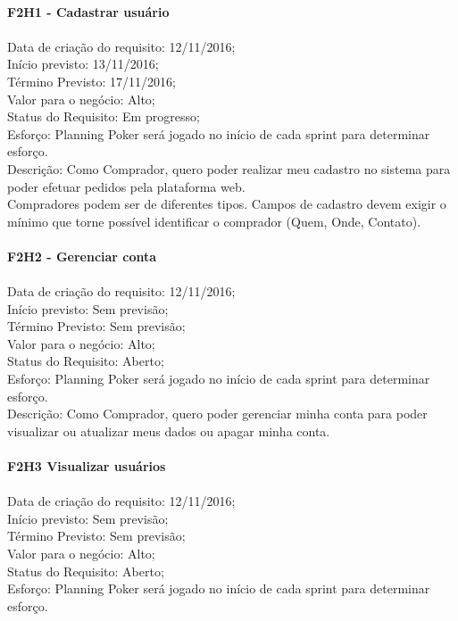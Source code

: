 \begin{apendicesenv}
\\
\textbf{F2H1 - Cadastrar usuário}\\ \\
\tab Data de criação do requisito: 12/11/2016;\\
\tab Início previsto: 13/11/2016;\\
\tab Término Previsto: 17/11/2016;\\
\tab Valor para o negócio: Alto;\\
\tab Status do Requisito: Em progresso;\\
\tab Esforço: Planning Poker será jogado no início de cada sprint para determinar esforço.\\
\tab Descrição: Como Comprador, quero poder realizar meu cadastro no sistema para poder efetuar pedidos pela plataforma web.\\
\tab Compradores podem ser de diferentes tipos. Campos de cadastro devem exigir o mínimo que torne possível identificar o comprador (Quem, Onde, Contato).\\
\\
\textbf{F2H2 - Gerenciar conta}\\ \\
\tab Data de criação do requisito: 12/11/2016;\\
\tab Início previsto: Sem previsão;\\
\tab Término Previsto: Sem previsão;\\
\tab Valor para o negócio: Alto;\\
\tab Status do Requisito: Aberto;\\
\tab Esforço: Planning Poker será jogado no início de cada sprint para determinar esforço.\\
\tab Descrição: Como Comprador, quero poder gerenciar minha conta para poder visualizar ou atualizar meus dados ou apagar minha conta.\\
\\
\textbf{F2H3 Visualizar usuários}\\ \\
\tab Data de criação do requisito: 12/11/2016;\\
\tab Início previsto: Sem previsão;\\
\tab Término Previsto: Sem previsão;\\
\tab Valor para o negócio: Alto;\\
\tab Status do Requisito: Aberto;\\
\tab Esforço: Planning Poker será jogado no início de cada sprint para determinar esforço.\\

\end{apendicesenv}
